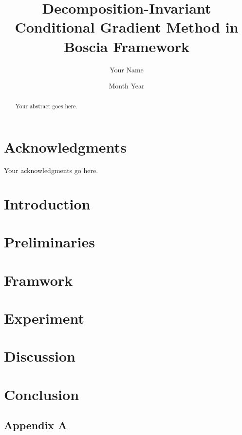 \documentclass[12pt]{article}
\title{Decomposition-Invariant Conditional Gradient Method in Boscia Framework}
\author{Your Name}
\date{Month Year}
\begin{document}
	
	\maketitle
	
	\begin{abstract}
		Your abstract goes here.
	\end{abstract}
	
	\section*{Acknowledgments}
	Your acknowledgments go here.
	
	\tableofcontents
	\listoffigures
	\listoftables
	
	\section{Introduction}
	
	
	\section{Preliminaries}
	
	
	\section{Framwork}
	
	
	\section{Experiment}
	
	
	\section{Discussion}
	
	
	\section{Conclusion}
	
	
	
	
	
	\begin{appendices}
		\section{Appendix A}
		
	\end{appendices}
	
\end{document}
